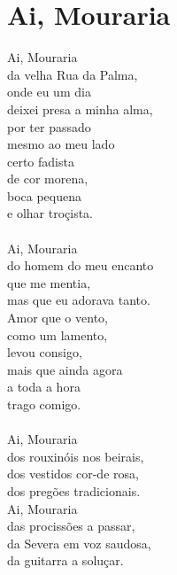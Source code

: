 \documentclass{article}
\begin{document}
\section{ Ai, Mouraria}
Ai, Mouraria\\
da velha Rua da Palma,\\
onde eu um dia\\
deixei presa a minha alma,\\
por ter passado\\
mesmo ao meu lado\\
certo fadista\\
de cor morena,\\
boca pequena\\
e olhar troçista.\\
\\
Ai, Mouraria\\
do homem do meu encanto\\
que me mentia,\\
mas que eu adorava tanto.\\
Amor que o vento,\\
como um lamento,\\
levou consigo,\\
mais que ainda agora\\
a toda a hora\\
trago comigo.\\
\\
Ai, Mouraria\\
dos rouxinóis nos beirais,\\
dos vestidos cor-de rosa,\\
dos pregões tradicionais.\\
Ai, Mouraria\\
das procissões a passar,\\
da Severa em voz saudosa,\\
da guitarra a soluçar.\\
\\
\\
\end{document}
